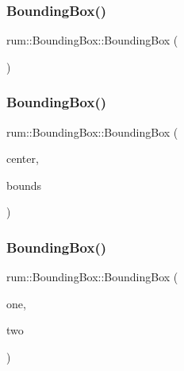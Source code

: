 \subsubsection{\texorpdfstring{Bounding\+Box()}{BoundingBox()}\hspace{0.1cm}{\footnotesize\ttfamily [1/3]}}
{\footnotesize\ttfamily rum\+::\+Bounding\+Box\+::\+Bounding\+Box (\begin{DoxyParamCaption}{ }\end{DoxyParamCaption})}

\mbox{\label{classrum_1_1_bounding_box_a60123b8bafc7fa4ef78cdf2a4c49eac3}} 
\subsubsection{\texorpdfstring{Bounding\+Box()}{BoundingBox()}\hspace{0.1cm}{\footnotesize\ttfamily [2/3]}}
{\footnotesize\ttfamily rum\+::\+Bounding\+Box\+::\+Bounding\+Box (\begin{DoxyParamCaption}\item[{const glm\+::vec3 \&}]{center,  }\item[{const glm\+::vec3 \&}]{bounds }\end{DoxyParamCaption})}

\mbox{\label{classrum_1_1_bounding_box_a68f722c0cc72e5c939fa1fa382b26330}} 
\subsubsection{\texorpdfstring{Bounding\+Box()}{BoundingBox()}\hspace{0.1cm}{\footnotesize\ttfamily [3/3]}}
{\footnotesize\ttfamily rum\+::\+Bounding\+Box\+::\+Bounding\+Box (\begin{DoxyParamCaption}\item[{const \mbox{\hyperlink{classrum_1_1_bounding_box}{Bounding\+Box}} \&}]{one,  }\item[{const \mbox{\hyperlink{classrum_1_1_bounding_box}{Bounding\+Box}} \&}]{two }\end{DoxyParamCaption})}

